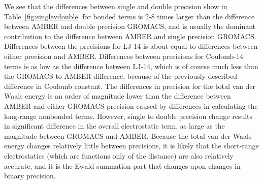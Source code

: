 We see that the differences between single and double precision show
in Table~\ref{fig:singlevdouble} for bonded terms is 2-8 times larger
than the difference between AMBER and double precision GROMACS, and is
usually the dominant contribution to the difference between AMBER and
single precision GROMACS.  Differences between the precisions for
LJ-14 is about equal to differences between either precision and
AMBER.  Differences between precisions for Coulomb-14 terms is as low
as the difference between LJ-14, which is of course much less than the
GROMACS to AMBER difference, because of the previously described
difference in Coulomb constant. The differences in precision for the
total van der Waals energy is an order of magnitude lower than the difference
between AMBER and either GROMACS precision caused by differences in
calculating the long-range nonbonded terms.  However, single to double
precision change results in significant difference in the overall
electrostatic term, as large as the magnitude between GROMACS and
AMBER.  Because the total van der Waals energy changes relatively
little between precisions, it is likely that the short-range
electrostatics (which are functions only of the distance) are also
relatively accurate, and it is the Ewald summation part that changes
upon changes in binary precision.

